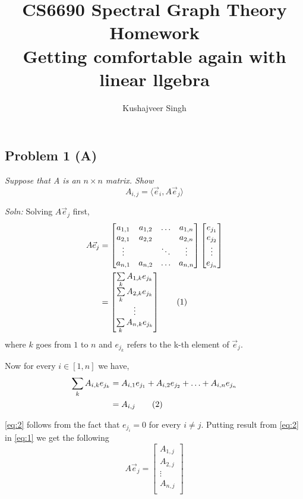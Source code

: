 \documentclass[12pt,a4paper]{article}
\title{CS6690 Spectral Graph Theory Homework\\Getting comfortable again with linear llgebra}
\author{Kushajveer Singh}
\date{}
\newcommand\numberthis{\addtocounter{equation}{1}\tag{\theequation}}
\begin{document}
\maketitle
    \subsection*{Problem 1 (A)}
    
    \textit{
        Suppose that \textit{A} is an $n \times n$ matrix. Show $$A_{i,j} = \langle \vec{e}_i, A\vec{e}_j \rangle$$
    }
    
    \noindent\textit{Soln: }Solving $A\vec{e}_j$ first,
    \begin{align*}
        A\vec{e}_j &=
        \begin{bmatrix}
            a_{1,1} & a_{1,2} & \hdots & a_{1,n} \\
            a_{2,1} & a_{2,2} & & a_{2,n} \\
            \vdots & & \ddots & \vdots \\
            a_{n,1} & a_{n,2} & \hdots & a_{n,n}
        \end{bmatrix}
        \begin{bmatrix}
            e_{j_1} \\
            e_{j_2} \\
            \vdots \\
            e_{j_n}
        \end{bmatrix}
        \\
         &= 
        \begin{bmatrix}
        \sum\limits_k A_{1,k}e_{j_k} \\
        \sum\limits_k A_{2,k}e_{j_k} \\
        \vdots \\
        \sum\limits_k A_{n,k}e_{j_k}
        \end{bmatrix} \numberthis \label{eq:1}
    \end{align*}
    where $k$ goes from $1$ to $n$ and $e_{j_k}$ refers to the k-th element of $\vec{e}_j$.
    
    Now for every $i \in [1,n]$ we have,
    \begin{align*}
        \sum\limits_k A_{i,k}e_{j_k} &= A_{i,1}e_{j_1} + A_{i,2}e_{j_2} + \hdots + A_{i,n}e_{j_n} \\
                                &= A_{i,j} \numberthis \label{eq:2}
    \end{align*}
    
    \eqref{eq:2} follows from the fact that $e_{j_i}=0$ for every $i \neq j$. Putting result from \eqref{eq:2} in \eqref{eq:1} we get the following
    \begin{equation}
        A\vec{e}_j = 
        \begin{bmatrix}
        A_{1,j} \\
        A_{2,j} \\
        \vdots \\
        A_{n,j} \\
        \end{bmatrix}
    \end{equation}
    
\end{document}

